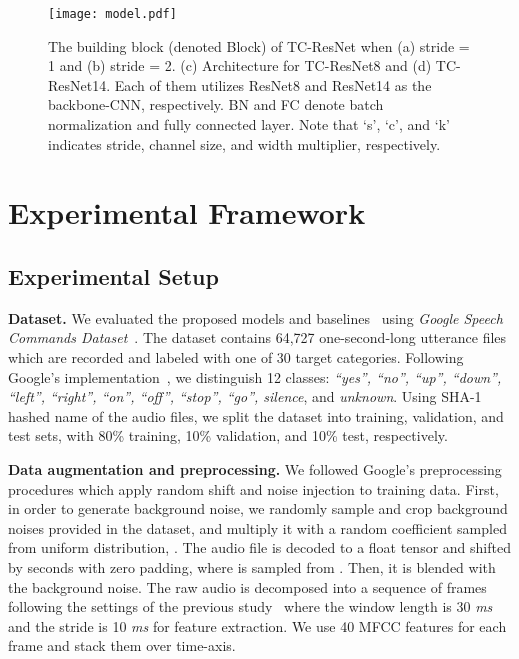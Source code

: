 \documentclass[a4paper]{article}
\begin{document}
\begin{figure}[t]
    \texttt{[image: model.pdf]}
    \caption{The building block (denoted Block) of TC-ResNet when (a) stride = 1 and (b) stride = 2.
    (c) Architecture for TC-ResNet8 and (d) TC-ResNet14.
    Each of them utilizes ResNet8 and ResNet14 as the backbone-CNN, respectively.
    BN and FC denote batch normalization and fully connected layer.
    Note that `s', `c', and `k' indicates stride, channel size, and width multiplier, respectively.
    }
    \vspace{-0.2cm}
    \label{fig:model}
\end{figure}





\section{Experimental Framework}\label{section:implementation}

\subsection{Experimental Setup} \label{subsection:experimentalsetup}
\textbf{Dataset.}
We evaluated the proposed models and baselines~\cite{sainath-interspeech-2015-cnn, tang-icassp-2018-residual, zhang-arxiv-2017-helloedge} using \emph{Google Speech Commands Dataset}~\cite{googlespeechcommandsv1}.
The dataset contains 64,727 one-second-long utterance files which are recorded and labeled with one of 30 target categories.
Following Google's implementation~\cite{googlespeechcommandsv1}, we distinguish 12 classes: \emph{``yes'', ``no'', ``up'', ``down'', ``left'', ``right'', ``on'', ``off'', ``stop'', ``go'', silence}, and \emph{unknown}.
Using SHA-1 hashed name of the audio files, we split the dataset into training, validation, and test sets, with 80\% training, 10\% validation, and 10\% test, respectively.

\textbf{Data augmentation and preprocessing.}
We followed Google's preprocessing procedures which apply random shift and noise injection to training data.
First, in order to generate background noise, we randomly sample and crop background noises provided in the dataset, and multiply it with a random coefficient sampled from uniform distribution, .
The audio file is decoded to a float tensor and shifted by  seconds with zero padding, where  is sampled from .
Then, it is blended with the background noise.
The raw audio is decomposed into a sequence of frames following the settings of the previous study~\cite{tang-icassp-2018-residual} where the window length is 30 \emph{ms} and the stride is 10 \emph{ms} for feature extraction.
We use 40 MFCC features for each frame and stack them over time-axis.
\end{document}
